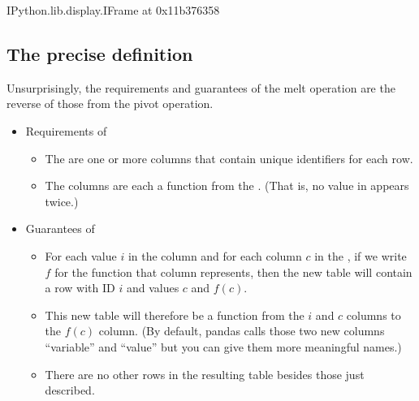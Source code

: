 \documentclass[letterpaper,10pt,english]{sphinxmanual}
\begin{document}
\begin{sphinxVerbatim}[commandchars=\\\{\}]
\PYGZlt{}IPython.lib.display.IFrame at 0x11b376358\PYGZgt{}
\end{sphinxVerbatim}


\subsection{The precise definition}
\label{\detokenize{chapter-6-single-table-verbs:id1}}
Unsurprisingly, the requirements and guarantees of the melt operation are the reverse of those from the pivot operation.
\begin{itemize}
\item {} 
Requirements of 
\begin{itemize}
\item {} 
The  are one or more columns that contain unique identifiers for each row.

\item {} 
The  columns are each a function from the .  (That is, no value in  appears twice.)

\end{itemize}

\item {} 
Guarantees of 
\begin{itemize}
\item {} 
For each value \(i\) in the  column and for each column \(c\) in the , if we write \(f\) for the function that column represents, then the new table will contain a row with ID \(i\) and values \(c\) and \(f(c)\).

\item {} 
This new table will therefore be a function from the \(i\) and \(c\) columns to the \(f(c)\) column.  (By default, pandas calls those two new columns “variable” and “value” but you can give them more meaningful names.)

\item {} 
There are no other rows in the resulting table besides those just described.

\end{itemize}

\end{itemize}
\end{document}
